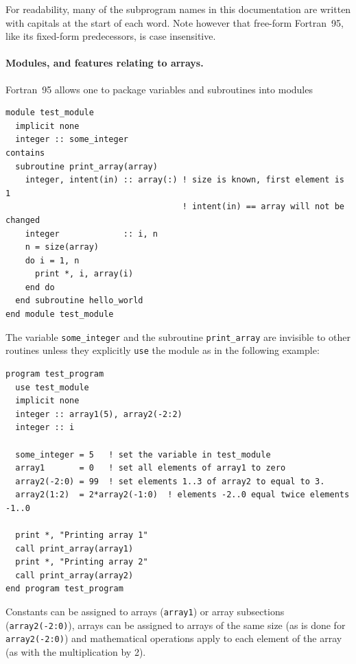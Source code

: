 \documentclass[12pt]{article}
\begin{document}
For readability, many of the subprogram names in this documentation
are written with capitals at the start of each word. Note however that
free-form Fortran~95, like its fixed-form predecessors, is case
insensitive.

\paragraph{Modules, and features relating to arrays.} Fortran~95
allows one to package variables and subroutines into modules
\begin{lstlisting}
module test_module
  implicit none
  integer :: some_integer
contains
  subroutine print_array(array)
    integer, intent(in) :: array(:) ! size is known, first element is 1
                                    ! intent(in) == array will not be changed
    integer             :: i, n
    n = size(array)
    do i = 1, n
      print *, i, array(i)
    end do
  end subroutine hello_world
end module test_module
\end{lstlisting}
The variable \texttt{some\_integer} and the subroutine
\texttt{print\_array} are invisible to other routines unless they
explicitly \texttt{use} the module as in the following example:
\begin{lstlisting}
program test_program
  use test_module
  implicit none
  integer :: array1(5), array2(-2:2)
  integer :: i
  
  some_integer = 5   ! set the variable in test_module
  array1       = 0   ! set all elements of array1 to zero
  array2(-2:0) = 99  ! set elements 1..3 of array2 to equal to 3.
  array2(1:2)  = 2*array2(-1:0)  ! elements -2..0 equal twice elements -1..0

  print *, "Printing array 1"
  call print_array(array1)
  print *, "Printing array 2"
  call print_array(array2)
end program test_program
\end{lstlisting}
Constants can be assigned to arrays (\texttt{array1}) or array
subsections (\texttt{array2(-2:0)}), arrays can be assigned to arrays
of the same size (as is done for \texttt{array2(-2:0)}) and
mathematical operations apply to each element of the array (as with
the multiplication by 2).
\end{document}

